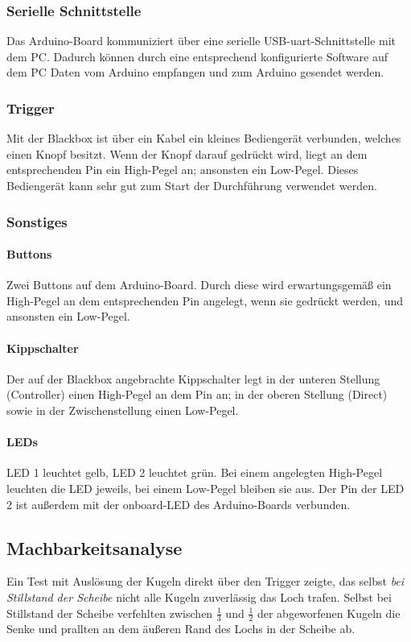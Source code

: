 \documentclass{kis}
\begin{document}
\subsubsection{Serielle Schnittstelle}
Das Arduino-Board kommuniziert über eine serielle USB-\gls{uart}-Schnittstelle mit dem PC. Dadurch können durch eine entsprechend konfigurierte Software auf dem PC Daten vom Arduino empfangen und zum Arduino gesendet werden.

\subsubsection{Trigger}
Mit der Blackbox ist über ein Kabel ein kleines Bediengerät verbunden, welches einen Knopf besitzt. Wenn der Knopf darauf gedrückt wird, liegt an dem entsprechenden Pin ein High-Pegel an; ansonsten ein Low-Pegel. Dieses Bediengerät kann sehr gut zum Start der Durchführung verwendet werden. 

\subsubsection{Sonstiges}
\paragraph{Buttons}
Zwei Buttons auf dem Arduino-Board. Durch diese wird erwartungsgemäß ein High-Pegel an dem entsprechenden Pin angelegt, wenn sie gedrückt werden, und ansonsten ein Low-Pegel.
\paragraph{Kippschalter}
Der auf der Blackbox angebrachte Kippschalter legt in der unteren Stellung (\glqq Controller\grqq) einen High-Pegel an dem Pin an; in der oberen Stellung (\glqq Direct\grqq) sowie in der Zwischenstellung einen Low-Pegel.
\paragraph{LEDs}
LED 1 leuchtet gelb, LED 2 leuchtet grün. Bei einem angelegten High-Pegel leuchten die LED jeweils, bei einem Low-Pegel bleiben sie aus. Der Pin der LED 2 ist außerdem mit der onboard-LED des Arduino-Boards verbunden.

\subsection{Machbarkeitsanalyse}
Ein Test mit Auslösung der Kugeln direkt über den Trigger zeigte, das selbst \emph{bei Stillstand der Scheibe} nicht alle Kugeln zuverlässig das Loch trafen. Selbst bei Stillstand der Scheibe verfehlten zwischen $\frac13$ und $\frac12$ der abgeworfenen Kugeln die Senke und prallten an dem äußeren Rand des Lochs in der Scheibe ab.
\end{document}
